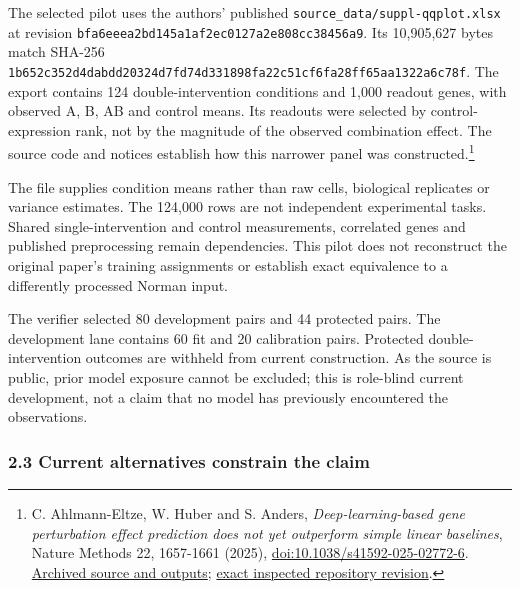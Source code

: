 \documentclass[
  10pt,
]{article}
\begin{document}
The selected pilot uses the authors' published
\texttt{source\_data/suppl-qqplot.xlsx} at revision
\nolinkurl{bfa6eeea2bd145a1af2ec0127a2e808cc38456a9}. Its 10,905,627 bytes
match SHA-256
\nolinkurl{1b652c352d4dabdd20324d7fd74d331898fa22c51cf6fa28ff65aa1322a6c78f}.
The export contains 124 double-intervention conditions and 1,000 readout
genes, with observed A, B, AB and control means. Its readouts were
selected by control-expression rank, not by the magnitude of the
observed combination effect. The source code and notices establish how
this narrower panel was constructed.\footnote{C. Ahlmann-Eltze, W. Huber
  and S. Anders, \emph{Deep-learning-based gene perturbation effect
  prediction does not yet outperform simple linear baselines}, Nature
  Methods 22, 1657-1661 (2025),
  \href{https://doi.org/10.1038/s41592-025-02772-6}{doi:10.1038/s41592-025-02772-6}.
  \href{https://doi.org/10.5281/zenodo.16092690}{Archived source and
  outputs};
  \href{https://github.com/const-ae/linear_perturbation_prediction-Paper/tree/bfa6eeea2bd145a1af2ec0127a2e808cc38456a9}{exact
  inspected repository revision}.}

The file supplies condition means rather than raw cells, biological
replicates or variance estimates. The 124,000 rows are not independent
experimental tasks. Shared single-intervention and control measurements,
correlated genes and published preprocessing remain dependencies. This
pilot does not reconstruct the original paper's training assignments or
establish exact equivalence to a differently processed Norman input.

The verifier selected 80 development pairs and 44 protected pairs. The
development lane contains 60 fit and 20 calibration pairs. Protected
double-intervention outcomes are withheld from current construction. As
the source is public, prior model exposure cannot be excluded; this is
role-blind current development, not a claim that no model has previously
encountered the observations.

\hypertarget{current-alternatives-constrain-the-claim}{%
\subsubsection{2.3 Current alternatives constrain the
claim}\label{current-alternatives-constrain-the-claim}}
\end{document}
